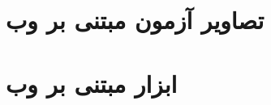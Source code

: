     
\let\Chapter\chapter
    
\chapter{تصاویر آزمون مبتنی بر وب}
\label{app:webbasedtask}
\TaskImagesCommand
% 
% 


\chapter{ابزار مبتنی بر وب}

